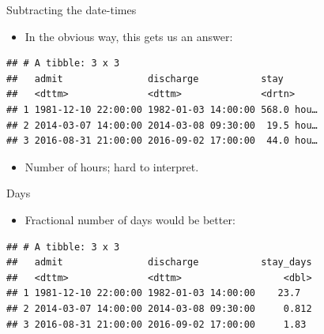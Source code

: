 \documentclass[
  ignorenonframetext,
]{beamer}
\newenvironment{Shaded}{\begin{snugshade}}{\end{snugshade}}
\newcommand{\DataTypeTok}[1]{\textcolor[rgb]{0.13,0.29,0.53}{#1}}
\newcommand{\DecValTok}[1]{\textcolor[rgb]{0.00,0.00,0.81}{#1}}
\newcommand{\KeywordTok}[1]{\textcolor[rgb]{0.13,0.29,0.53}{\textbf{#1}}}
\newcommand{\NormalTok}[1]{#1}
\newcommand{\OperatorTok}[1]{\textcolor[rgb]{0.81,0.36,0.00}{\textbf{#1}}}
\newcommand{\StringTok}[1]{\textcolor[rgb]{0.31,0.60,0.02}{#1}}
\providecommand{\tightlist}{%
  \setlength{\itemsep}{0pt}\setlength{\parskip}{0pt}}
\begin{document}
\begin{frame}[fragile]{Subtracting the date-times}
\protect\hypertarget{subtracting-the-date-times}{}

\begin{itemize}
\tightlist
\item
  In the obvious way, this gets us an answer:
\end{itemize}

\begin{Shaded}
\end{Shaded}

\begin{verbatim}
## # A tibble: 3 x 3
##   admit               discharge           stay      
##   <dttm>              <dttm>              <drtn>    
## 1 1981-12-10 22:00:00 1982-01-03 14:00:00 568.0 hou…
## 2 2014-03-07 14:00:00 2014-03-08 09:30:00  19.5 hou…
## 3 2016-08-31 21:00:00 2016-09-02 17:00:00  44.0 hou…
\end{verbatim}

\begin{itemize}
\tightlist
\item
  Number of hours; hard to interpret.
\end{itemize}

\end{frame}

\begin{frame}[fragile]{Days}
\protect\hypertarget{days}{}

\begin{itemize}
\tightlist
\item
  Fractional number of days would be better:
\end{itemize}

\begin{Shaded}
\end{Shaded}

\begin{verbatim}
## # A tibble: 3 x 3
##   admit               discharge           stay_days
##   <dttm>              <dttm>                  <dbl>
## 1 1981-12-10 22:00:00 1982-01-03 14:00:00    23.7  
## 2 2014-03-07 14:00:00 2014-03-08 09:30:00     0.812
## 3 2016-08-31 21:00:00 2016-09-02 17:00:00     1.83
\end{verbatim}

\end{frame}
\end{document}

